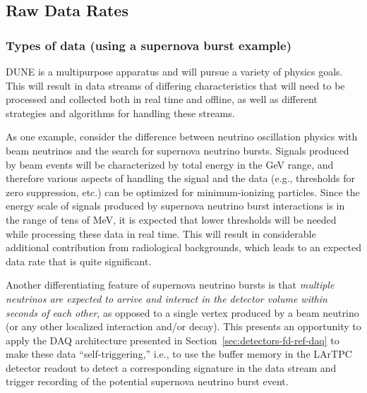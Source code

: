 \subsection{Raw Data Rates}
\label{sec:detectors-sc-infrastructure-data-rates}


\subsubsection{Types of data (using a supernova burst example)}
DUNE is a multipurpose apparatus and will pursue a variety of physics
goals.  %
This will result in data streams of differing
characteristics that will need to be processed and collected both in real time
and offline, as well as different strategies and algorithms for
handling these streams.


As one example, consider the difference between neutrino oscillation
physics with beam neutrinos and the search for supernova
neutrino bursts.  Signals produced by beam events
will be characterized by total energy in the GeV range, and therefore
various aspects of handling the signal and the data (e.g., thresholds
for zero suppression, etc.) can be optimized for minimum-ionizing
particles.
Since the energy scale of signals produced by supernova
neutrino burst interactions is in the range of tens of MeV, 
it is expected that lower thresholds will be needed
while processing these data in real time. This will result in
considerable additional contribution from radiological backgrounds, which 
leads to an expected data rate that is 
quite significant.

Another differentiating feature of supernova neutrino bursts is that
\textit{multiple neutrinos are expected to arrive and interact in the
  detector volume within seconds of each other}, as opposed to a
single vertex produced by a beam neutrino (or any other localized
interaction and/or decay). This presents an opportunity to apply the
DAQ architecture presented in Section~\ref{sec:detectors-fd-ref-daq} to make
these data ``self-triggering,'' i.e.,  to use the buffer memory in the
LArTPC detector readout to detect a corresponding signature in the
data stream and trigger recording of the potential supernova neutrino
burst event.

